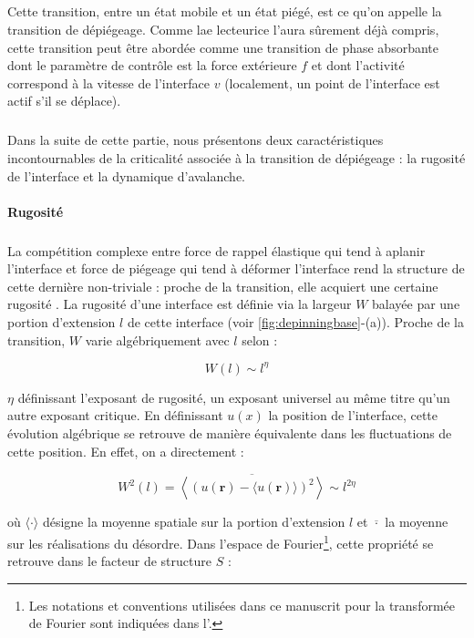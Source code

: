 \subparagraph{}Cette transition, entre un état mobile et un état piégé, est ce qu'on appelle la transition de dépiégeage. Comme lae lecteurice l'aura sûrement déjà compris, cette transition peut être abordée comme une transition de phase absorbante dont le paramètre de contrôle est la force extérieure $f$ et dont l'activité correspond à la vitesse de l'interface $v$ (localement, un point de l'interface est actif s'il se déplace). 


\subparagraph{}Dans la suite de cette partie, nous présentons deux caractéristiques incontournables de la criticalité associée à la transition de dépiégeage : la rugosité de l'interface et la dynamique d'avalanche.

\paragraph{Rugosité}

\subparagraph{}La compétition complexe entre force de rappel élastique qui tend à aplanir l'interface et force de piégeage qui tend à déformer l'interface rend la structure de cette dernière non-triviale : proche de la transition, elle acquiert une certaine rugosité \cite{fisher_collective_1998, wiese_theory_2022}. La rugosité d'une interface est définie via la largeur $W$ balayée par une portion d'extension $l$ de cette interface (voir \autoref{fig:depinningbase}-(a)). Proche de la transition, $W$ varie algébriquement avec $l$ selon :

\begin{equation}
	W(l) \sim l^\eta
\end{equation}

\noindent $\eta$ définissant l'exposant de rugosité, un exposant universel au même titre qu'un autre exposant critique. En définissant $u(x)$ la position de l'interface, cette évolution algébrique se retrouve de manière équivalente dans les fluctuations de cette position. En effet, on a directement :

\begin{equation}
	W^2(l) = \overline{\left\langle (u(\mathbf{r}) - \langle u(\mathbf{r}) \rangle)^2\right\rangle} \sim l^{2\eta}
\end{equation}

\noindent où $\langle \cdot \rangle$ désigne la moyenne spatiale sur la portion d'extension $l$ et $\overline{\cdot}$ la moyenne sur les réalisations du désordre. Dans l'espace de Fourier\footnote{Les notations et conventions utilisées dans ce manuscrit pour la transformée de Fourier sont indiquées dans l'.}, cette propriété se retrouve dans le facteur de structure $S$ : 

